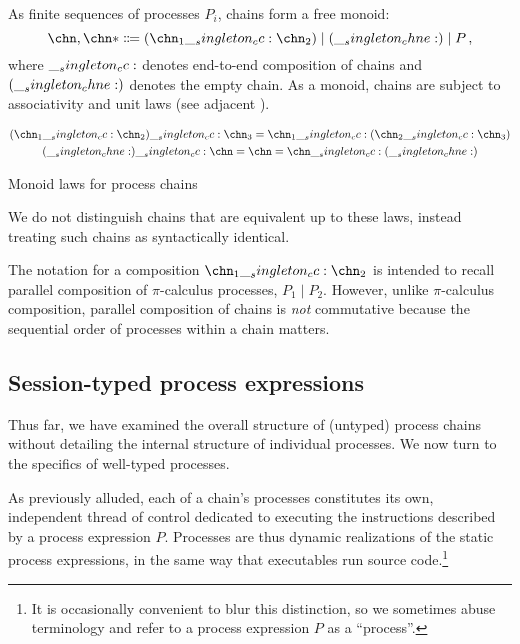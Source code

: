 As finite sequences of processes $P_i$, chains form a free monoid:
\begin{equation*}
  \chn,\chn* \Coloneqq (\chn_1 \cc \chn_2) \mid (\chne) \mid P
  \,,
\end{equation*}
where $\__singleton_cc:$ denotes end-to-end composition of chains and $(\__singleton_chne:)$ denotes the empty chain.
As a monoid, chains are subject to associativity and unit laws (see adjacent ).
\begin{marginfigure}
\begin{gather*}
  (\chn_1 \cc \chn_2) \cc \chn_3 = \chn_1 \cc (\chn_2 \cc \chn_3) \\
  (\chne) \cc \chn = \chn = \chn \cc (\chne)
\end{gather*}
\caption{Monoid laws for process chains}\label{fig:chains:monoid-laws}
\end{marginfigure}
We do not distinguish chains that are equivalent up to these laws, instead treating such chains as syntactically identical.

The notation for a composition $\chn_1 \cc \chn_2$ is intended to recall parallel composition of $\pi$-calculus processes, $P_1 \mid P_2$.
However, unlike $\pi$-calculus composition, parallel composition of chains is \emph{not} commutative because the sequential order of processes within a chain matters.


\subsection{Session-typed process expressions}

Thus far, we have examined the overall structure of (untyped) process chains without detailing the internal structure of individual processes.
We now turn to the specifics of well-typed processes.

As previously alluded, each of a chain's processes constitutes its own, independent thread of control dedicated to executing the instructions described by a process expression $P$.
Processes are thus dynamic realizations of the static process expressions, in the same way that executables run source code.\footnote{It is occasionally convenient to blur this distinction, so we sometimes abuse terminology and refer to a process expression $P$ as a \enquote{process}.}


